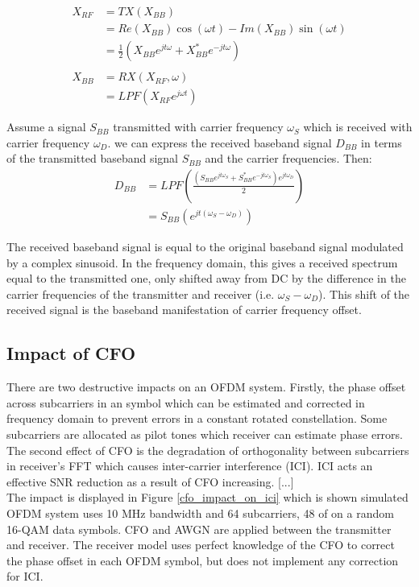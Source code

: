 \begin{equation}\label{eq_tx_rx_process}
\begin{split}
X_{RF} & = TX(X_{BB})\\
& = Re(X_{BB})\cos(\omega t) - Im(X_{BB})\sin(\omega t)\\
& = \frac{1}{2} (X_{BB} e^{jt\omega} + X^{*}_{BB} e^{-jt\omega})\\
\\
X_{BB} & = RX(X_{RF}, \omega)\\
& = LPF(X_{RF} e^{j\omega t})
\end{split}
\end{equation}


Assume a signal $S_{BB}$ transmitted with carrier frequency $\omega_{S}$ which is received with carrier frequency $\omega_{D}$. we can express the received baseband signal $D_{BB}$ in terms of the transmitted baseband signal $S_{BB}$ and the carrier frequencies. Then:\\

\begin{equation} \label{DBB_SBB}
\begin{split}
D_{BB} & = LPF(\frac{(S_{BB} e^{jt\omega_{S}} + S^{*}_{BB} e^{-jt\omega_{S}})e^{jt\omega_{D}}}{2})\\
&= S_{BB}(e^{jt(\omega_{S}- \omega_{D})})
\end{split}
\end{equation}

The received baseband signal is equal to the original baseband signal modulated by a complex sinusoid. In the frequency domain, this gives a received spectrum equal to the transmitted one, only shifted away from DC by the difference in the carrier frequencies of the transmitter and receiver (i.e. $\omega_{S}- \omega_{D}$). This shift of the received
signal is the baseband manifestation of carrier frequency offset.

\subsection{Impact of CFO}
\label{Impact_of_CFO}
There are two destructive impacts on an OFDM system. Firstly, the phase offset across subcarriers in an symbol which can be  estimated and corrected in frequency domain to prevent errors in a constant rotated constellation. Some subcarriers are allocated as pilot tones which receiver can estimate phase errors.\\
The second effect of CFO is the degradation of orthogonality between subcarriers in receiver's FFT which causes inter-carrier interference (ICI). ICI acts an effective SNR reduction as a result of CFO increasing. [...]\\
The impact is displayed in Figure \ref{cfo_impact_on_ici} which is shown simulated OFDM system uses 10 MHz bandwidth and 64 subcarriers, 48 of on a random 16-QAM data symbols. CFO and AWGN are applied between the transmitter and receiver. The receiver model uses perfect knowledge of the CFO to correct the phase offset in each OFDM symbol, but does not implement any correction for ICI.\\

